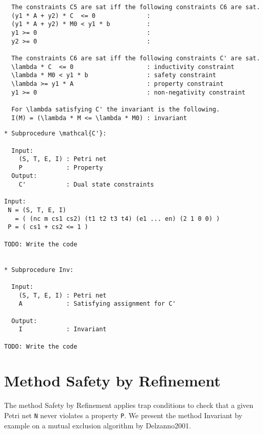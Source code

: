 \documentclass{article}
\begin{document}
\begin{verbatim}
  The constraints C5 are sat iff the following constraints C6 are sat.
  (y1 * A + y2) * C  <= 0              : 
  (y1 * A + y2) * M0 < y1 * b          : 
  y1 >= 0                              : 
  y2 >= 0                              : 

  The constraints C6 are sat iff the following constraints C' are sat.
  \lambda * C  <= 0                    : inductivity constraint
  \lambda * M0 < y1 * b                : safety constraint
  \lambda >= y1 * A                    : property constraint
  y1 >= 0                              : non-negativity constraint

  For \lambda satisfying C' the invariant is the following.
  I(M) = (\lambda * M <= \lambda * M0) : invariant
\end{verbatim}

\newpage
\begin{verbatim}
* Subprocedure \mathcal{C'}:

  Input:
    (S, T, E, I) : Petri net
    P            : Property
  Output:
    C'           : Dual state constraints

Input:
 N = (S, T, E, I)
   = ( (nc m cs1 cs2) (t1 t2 t3 t4) (e1 ... en) (2 1 0 0) )
 P = ( cs1 + cs2 <= 1 )

TODO: Write the code


* Subprocedure Inv:

  Input:
    (S, T, E, I) : Petri net
    A            : Satisfying assignment for C'

  Output:
    I            : Invariant

TODO: Write the code
\end{verbatim}

\newpage
\section{Method Safety by Refinement}

The method Safety by Refinement applies trap conditions to check that a given Petri net \verb=N= never violates a property \verb=P=.
We present the method Invariant by example on a mutual exclusion algorithm by Delzanno2001.
\end{document}
